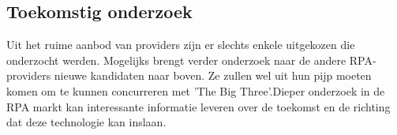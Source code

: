 \documentclass[a0,portrait]{a0poster}
\begin{document}
\begin{multicols}{2}
\section*{Toekomstig onderzoek}
\color{black}
Uit het ruime aanbod van providers zijn er slechts enkele uitgekozen die onderzocht werden. Mogelijks brengt verder onderzoek naar de andere RPA-providers nieuwe kandidaten naar boven. Ze zullen wel uit hun pijp moeten komen om te kunnen concurreren met 'The Big Three'.Dieper onderzoek in de RPA markt kan interessante informatie leveren over de toekomst en de richting dat deze technologie kan inslaan.


\end{multicols}
\end{document}
